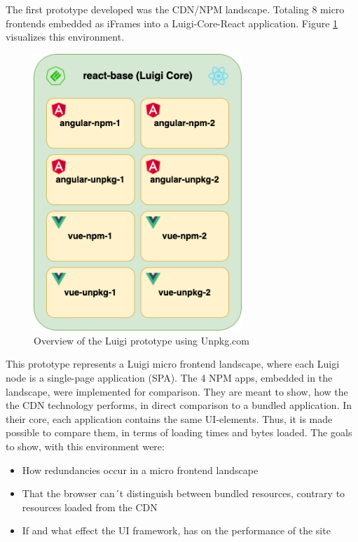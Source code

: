 The first prototype developed was the CDN/NPM landscape. Totaling 8 micro frontends embedded as iFrames into a Luigi-Core-React application.
Figure \ref{fig:unpkg_prototype_architecture} visualizes this environment.
 
\begin{figure}[!h]
	\centering
	\includegraphics[width=0.7\textwidth]{Figures/unpkg.architecture.drawio.png}
	\caption{Overview of the Luigi prototype using Unpkg.com}
	\label{fig:unpkg_prototype_architecture}
\end{figure}

This prototype represents a Luigi micro frontend landscape, where each Luigi node is a single-page application (SPA). 
The 4 NPM apps, embedded in the landscape, were implemented for comparison. They are meant to show, how the the CDN technology performs, in direct comparison to a bundled application.
In their core, each application contains the same UI-elements. Thus, it is made possible to compare them, in terms of loading times and bytes loaded.
The goals to show, with this environment were:

\begin{itemize}
	\item How redundancies occur in a micro frontend landscape
	\item That the browser can´t distinguish between bundled resources, contrary to resources loaded from the CDN
	\item If and what effect the UI framework, has on the performance of the site
\end{itemize}

